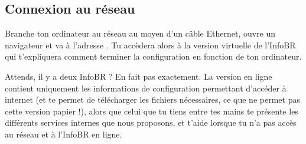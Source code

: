 
\subsection{Connexion au réseau}

Branche ton ordinateur au réseau au moyen d'un câble Ethernet, ouvre un navigateur et va à l'adresse . Tu accèdera alors à la version virtuelle de l'InfoBR qui t'expliquera comment terminer la configuration en fonction de ton ordinateur.


Attends, il y a deux InfoBR ? En fait pas exactement. La version en ligne contient uniquement les informations de configuration permettant d'accéder à internet (et te permet de télécharger les fichiers nécessaires, ce que ne permet pas cette version papier !), alors que celui que tu tiens entre tes mains te présente les différents services internes que nous proposons, et t'aide lorsque tu n'a pas accès au réseau et à l'InfoBR en ligne.

\clearpage